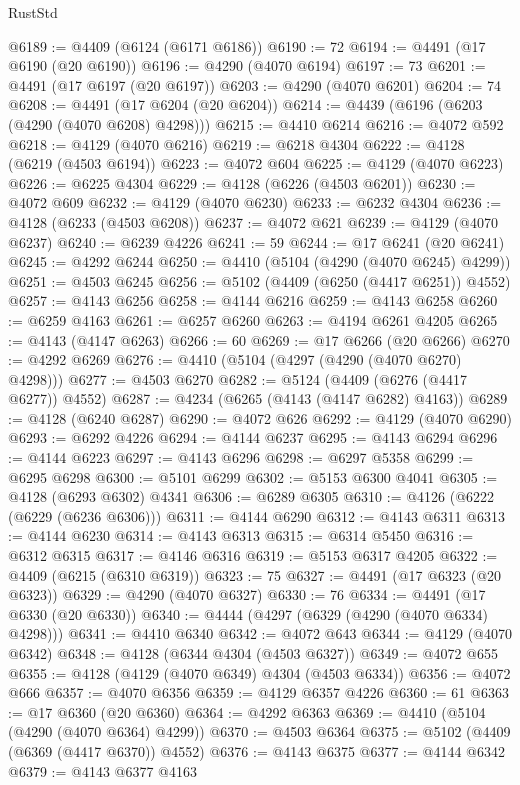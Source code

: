 \begin{lexlean}{RustStd}
\begin{coremodule}
@6189 := @4409 (@6124 (@6171 @6186))
@6190 := 72
@6194 := @4491 (@17 @6190 (@20 @6190))
@6196 := @4290 (@4070 @6194)
@6197 := 73
@6201 := @4491 (@17 @6197 (@20 @6197))
@6203 := @4290 (@4070 @6201)
@6204 := 74
@6208 := @4491 (@17 @6204 (@20 @6204))
@6214 := @4439 (@6196 (@6203 (@4290 (@4070 @6208) @4298)))
@6215 := @4410 @6214
@6216 := @4072 @592
@6218 := @4129 (@4070 @6216)
@6219 := @6218 @4304
@6222 := @4128 (@6219 (@4503 @6194))
@6223 := @4072 @604
@6225 := @4129 (@4070 @6223)
@6226 := @6225 @4304
@6229 := @4128 (@6226 (@4503 @6201))
@6230 := @4072 @609
@6232 := @4129 (@4070 @6230)
@6233 := @6232 @4304
@6236 := @4128 (@6233 (@4503 @6208))
@6237 := @4072 @621
@6239 := @4129 (@4070 @6237)
@6240 := @6239 @4226
@6241 := 59
@6244 := @17 @6241 (@20 @6241)
@6245 := @4292 @6244
@6250 := @4410 (@5104 (@4290 (@4070 @6245) @4299))
@6251 := @4503 @6245
@6256 := @5102 (@4409 (@6250 (@4417 @6251)) @4552)
@6257 := @4143 @6256
@6258 := @4144 @6216
@6259 := @4143 @6258
@6260 := @6259 @4163
@6261 := @6257 @6260
@6263 := @4194 @6261 @4205
@6265 := @4143 (@4147 @6263)
@6266 := 60
@6269 := @17 @6266 (@20 @6266)
@6270 := @4292 @6269
@6276 := @4410 (@5104 (@4297 (@4290 (@4070 @6270) @4298)))
@6277 := @4503 @6270
@6282 := @5124 (@4409 (@6276 (@4417 @6277)) @4552)
@6287 := @4234 (@6265 (@4143 (@4147 @6282) @4163))
@6289 := @4128 (@6240 @6287)
@6290 := @4072 @626
@6292 := @4129 (@4070 @6290)
@6293 := @6292 @4226
@6294 := @4144 @6237
@6295 := @4143 @6294
@6296 := @4144 @6223
@6297 := @4143 @6296
@6298 := @6297 @5358
@6299 := @6295 @6298
@6300 := @5101 @6299
@6302 := @5153 @6300 @4041
@6305 := @4128 (@6293 @6302) @4341
@6306 := @6289 @6305
@6310 := @4126 (@6222 (@6229 (@6236 @6306)))
@6311 := @4144 @6290
@6312 := @4143 @6311
@6313 := @4144 @6230
@6314 := @4143 @6313
@6315 := @6314 @5450
@6316 := @6312 @6315
@6317 := @4146 @6316
@6319 := @5153 @6317 @4205
@6322 := @4409 (@6215 (@6310 @6319))
@6323 := 75
@6327 := @4491 (@17 @6323 (@20 @6323))
@6329 := @4290 (@4070 @6327)
@6330 := 76
@6334 := @4491 (@17 @6330 (@20 @6330))
@6340 := @4444 (@4297 (@6329 (@4290 (@4070 @6334) @4298)))
@6341 := @4410 @6340
@6342 := @4072 @643
@6344 := @4129 (@4070 @6342)
@6348 := @4128 (@6344 @4304 (@4503 @6327))
@6349 := @4072 @655
@6355 := @4128 (@4129 (@4070 @6349) @4304 (@4503 @6334))
@6356 := @4072 @666
@6357 := @4070 @6356
@6359 := @4129 @6357 @4226
@6360 := 61
@6363 := @17 @6360 (@20 @6360)
@6364 := @4292 @6363
@6369 := @4410 (@5104 (@4290 (@4070 @6364) @4299))
@6370 := @4503 @6364
@6375 := @5102 (@4409 (@6369 (@4417 @6370)) @4552)
@6376 := @4143 @6375
@6377 := @4144 @6342
@6379 := @4143 @6377 @4163

\end{coremodule}
\end{lexlean}
